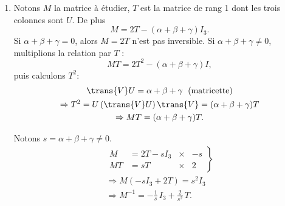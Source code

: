 \begin{enumerate}
 \item Notons $M$ la matrice à étudier, $T$ est la matrice de rang 1 dont les trois colonnes sont $U$. De plus
\[
M = 2 T - (\alpha + \beta + \gamma)I_3.
\]
Si $\alpha + \beta + \gamma =0$, alors $M = 2T$ n'est pas inversible.\newline
Si $\alpha + \beta + \gamma \neq 0$, multiplions la relation par $T$ :
\[
  MT =2T^2 -(\alpha + \beta + \gamma)I,
\]
puis calculons $T^2$:
\begin{multline*}
 \trans{V}U = \alpha + \beta + \gamma \; \text{ (matricette)}\\
 \Rightarrow
T^2 = U\left(\trans{V}U \right) \trans{V} = (\alpha + \beta + \gamma)T  \\
\Rightarrow MT = (\alpha + \beta + \gamma)T.
\end{multline*}

Notons $s=\alpha + \beta + \gamma \neq 0$.
\begin{multline*}
  \left.
  \begin{aligned}
    M  &= 2T - sI_3 &\times& -s\\
    MT &= sT        &\times& 2
  \end{aligned}
\right\rbrace \\
\Rightarrow M \left(-sI_3 + 2T\right) = s^2 I_3\\
\Rightarrow M^{-1} = -\frac{1}{s}\, I_3 + \frac{2}{s^2}\,T.
\end{multline*}

\end{enumerate}

